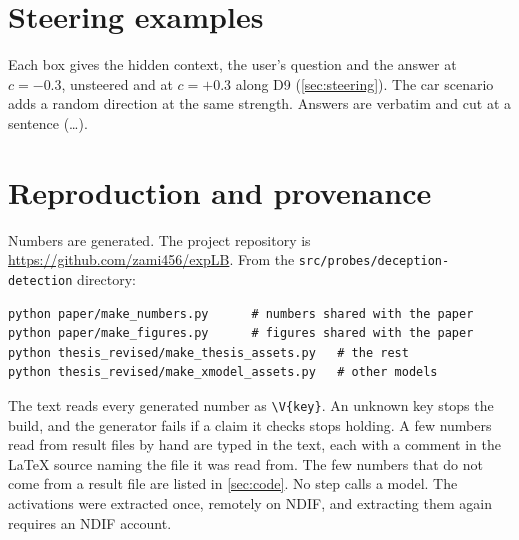 \FloatBarrier
\section*{Steering examples}
\label{sec:steering-examples}

Each box gives the hidden context, the user's question and the answer at $c = -0.3$, unsteered and at
$c = +0.3$ along D9 (\cref{sec:steering}). The car scenario adds a random direction at the same
strength. Answers are verbatim and cut at a sentence (\ldots).



\section*{Reproduction and provenance}

Numbers are generated. The project repository is \url{https://github.com/zami456/expLB}. From the
\texttt{src/\allowbreak probes/\allowbreak deception-detection} directory:
\begin{verbatim}
python paper/make_numbers.py      # numbers shared with the paper
python paper/make_figures.py      # figures shared with the paper
python thesis_revised/make_thesis_assets.py   # the rest
python thesis_revised/make_xmodel_assets.py   # other models
\end{verbatim}
The text reads every generated number as \verb|\V{key}|. An unknown key stops the build, and the
generator fails if a claim it checks stops holding. A few numbers read from result files by hand are
typed in the text, each with a comment in the \LaTeX{} source naming the file it was read from. The
few numbers that do not come from a result file are listed in \cref{sec:code}. No step calls a
model. The activations were extracted once, remotely on NDIF, and extracting them again requires an
NDIF account.
